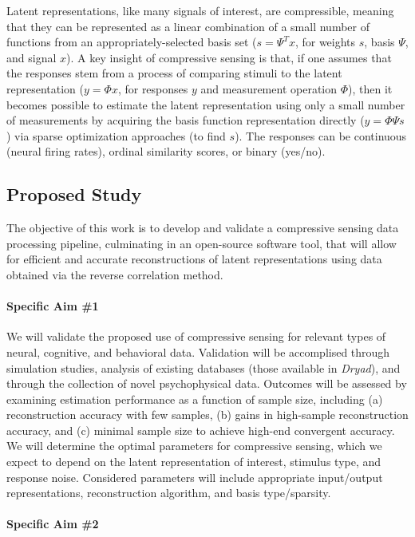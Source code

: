 Latent representations, like many signals of interest, are compressible,
meaning that they can be represented as a linear combination of a small number of functions from an appropriately-selected basis set
(\ie $s = \Psi^T x$, for weights $s$, basis $\Psi$, and signal $x$).
A key insight of compressive sensing is that,
if one assumes that the responses stem from a process of comparing stimuli to the latent representation
(\ie $y = \Phi x$, for responses $y$ and measurement operation $\Phi$),
then it becomes possible to estimate the latent representation using only a small number of measurements
by acquiring the basis function representation directly
(\ie $y = \Phi \Psi s$) via sparse optimization approaches (to find $s$).
The responses can be continuous (\eg neural firing rates), ordinal similarity scores,
or binary (\ie yes/no).

\subsection{Proposed Study}

The objective of this work is to develop and validate a compressive sensing data processing pipeline,
culminating in an open-source software tool, that will allow for efficient and accurate reconstructions of latent representations using data obtained via the reverse correlation method.

\paragraph{Specific Aim \#1}

We will validate the proposed use of compressive sensing for relevant types of neural, cognitive, and behavioral data.
Validation will be accomplised through simulation studies, analysis of existing databases (\eg those available in \emph{Dryad}),
and through the collection of novel psychophysical data.
Outcomes will be assessed by examining estimation performance as a function of sample size,
including (a) reconstruction accuracy with few samples, (b) gains in high-sample reconstruction accuracy,
and (c) minimal sample size to achieve high-end convergent accuracy.
We will determine the optimal parameters for compressive sensing, which we expect to depend on the latent representation of interest, stimulus type, and response noise.
Considered parameters will include appropriate input/output representations, reconstruction algorithm, and basis type/sparsity.

\paragraph{Specific Aim \#2}


